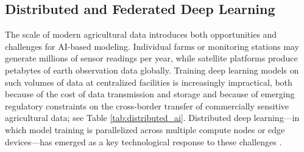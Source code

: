\documentclass[land,review,accept,pdftex,oneauthor]{Definitions/mdpi}
\begin{document}
\subsection{Distributed and Federated Deep Learning}

The scale of modern agricultural data introduces both opportunities and challenges for AI-based modeling. Individual farms or monitoring stations may generate millions of sensor readings per year, while satellite platforms produce petabytes of earth observation data globally. Training deep learning models on such volumes of data at centralized facilities is increasingly impractical, both because of the cost of data transmission and storage and because of emerging regulatory constraints on the cross-border transfer of commercially sensitive agricultural data; see Table \ref{tab:distributed_ai}. Distributed deep learning---in which model training is parallelized across multiple compute nodes or edge devices---has emerged as a key technological response to these challenges \citep{ben2019demystifying}.

\end{document}
